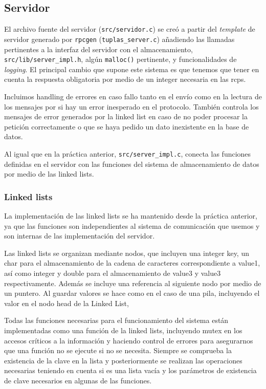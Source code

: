 \subsection{Servidor}
El archivo fuente del servidor (\texttt{src/servidor.c}) se creó a partir del \textit{template} de servidor generado por \texttt{rpcgen} (\texttt{tuplas\_server.c}) añadiendo las llamadas pertinentes a la interfaz del servidor con el almacenamiento, \texttt{src/lib/server\_impl.h}, algún \texttt{malloc()} pertinente, y funcionalidades de \textit{logging}. El principal cambio que supone este sistema es que tenemos que tener en cuenta la respuesta obligatoria por medio de un integer necesaria en las rcps.

Incluimos handling de errores en caso fallo tanto en el envío como en la lectura de los mensajes por si hay un error inesperado en el protocolo. También controla los mensajes de error generados por la linked list en caso de no poder procesar la petición correctamente o que se haya pedido un dato inexistente en la base de datos.

Al igual que en la práctica anterior, \texttt{src/server\_impl.c}, conecta las funciones definidas en el servidor con las funciones del sistema de almacenamiento de datos por medio de las linked lists. 

\subsubsection{Linked lists}

La implementación de las linked lists se ha mantenido desde la práctica anterior, ya que las funciones son independientes al sistema de comunicación que usemos y son internas de las implementación del servidor.

Las linked lists se organizan mediante nodos, que incluyen una integer key, un char para el almacenamiento de la cadena de caracteres correspondiente a value1, así como integer y double para el almacenamiento de value3 y value3 respectivamente. Además se incluye una referencia al siguiente nodo por medio de un puntero. Al guardar valores se hace como en el caso de una pila, incluyendo el valor en el nodo head de la Linked List,

Todas las funciones necesarias para el funcionamiento del sistema están implementadas como una función de la linked lists, incluyendo mutex en los accesos críticos a la información y haciendo control de errores para asegurarnos que una función no se ejecute si no se necesita. Siempre se comprueba la existencia de la clave en la lista y posteriormente se realizan las operaciones necesarias teniendo en cuenta si es una lista vacía y los parámetros de existencia de clave necesarios en algunas de las funciones.


